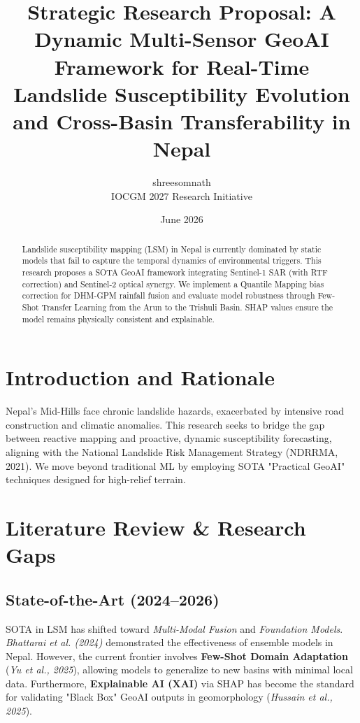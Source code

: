 \documentclass[12pt,a4paper]{article}
\title{\textbf{Strategic Research Proposal: A Dynamic Multi-Sensor GeoAI Framework for Real-Time Landslide Susceptibility Evolution and Cross-Basin Transferability in Nepal}}
\author{shreesomnath \\ \small{IOCGM 2027 Research Initiative}}
\date{June 2026}
\begin{document}
\maketitle

\begin{abstract}
Landslide susceptibility mapping (LSM) in Nepal is currently dominated by static models that fail to capture the temporal dynamics of environmental triggers. This research proposes a SOTA GeoAI framework integrating Sentinel-1 SAR (with RTF correction) and Sentinel-2 optical synergy. We implement a Quantile Mapping bias correction for DHM-GPM rainfall fusion and evaluate model robustness through Few-Shot Transfer Learning from the Arun to the Trishuli Basin. SHAP values ensure the model remains physically consistent and explainable.
\end{abstract}

\section{Introduction and Rationale}
Nepal's Mid-Hills face chronic landslide hazards, exacerbated by intensive road construction and climatic anomalies. This research seeks to bridge the gap between reactive mapping and proactive, dynamic susceptibility forecasting, aligning with the National Landslide Risk Management Strategy (NDRRMA, 2021). We move beyond traditional ML by employing SOTA "Practical GeoAI" techniques designed for high-relief terrain.

\section{Literature Review \& Research Gaps}
\subsection{State-of-the-Art (2024--2026)}
SOTA in LSM has shifted toward \textit{Multi-Modal Fusion} and \textit{Foundation Models}. \textit{Bhattarai et al. (2024)} demonstrated the effectiveness of ensemble models in Nepal. However, the current frontier involves \textbf{Few-Shot Domain Adaptation} (\textit{Yu et al., 2025}), allowing models to generalize to new basins with minimal local data. Furthermore, \textbf{Explainable AI (XAI)} via SHAP has become the standard for validating "Black Box" GeoAI outputs in geomorphology (\textit{Hussain et al., 2025}).
\end{document}

